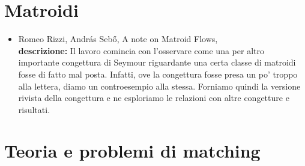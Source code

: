 \documentclass[10pt]{article}
\begin{document}
\section{Matroidi}

\begin{itemize}
  \vspace{1.4mm}
  \item[] {\sc Romeo Rizzi, Andr\'{a}s Seb\H{o}},
   \newblock A note on Matroid Flows,
   \\
{\bf descrizione:}
Il lavoro comincia con l'osservare
come una per altro importante
congettura di Seymour riguardante
una certa classe di matroidi
fosse di fatto mal posta.
Infatti,
ove la congettura fosse presa un po' troppo alla lettera,
diamo un controesempio alla stessa.
Forniamo quindi la versione rivista della congettura
e ne esploriamo le relazioni con altre
congetture e risultati.\\
\end{itemize}



\section{Teoria e problemi di matching}
\end{document}
